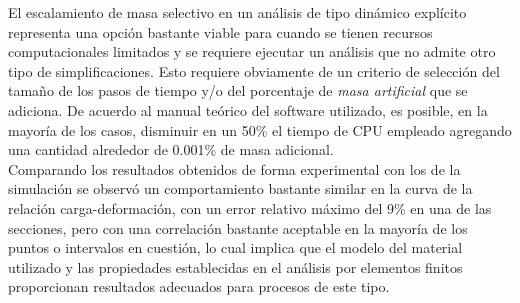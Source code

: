 El escalamiento de masa selectivo en un análisis de tipo dinámico explícito representa una 
opción bastante viable para cuando se tienen recursos computacionales limitados y se 
requiere ejecutar un análisis que no admite otro tipo de simplificaciones. Esto requiere 
obviamente de un criterio de selección del tamaño de los pasos de tiempo y/o del porcentaje 
de \textit{masa artificial} que se adiciona. De acuerdo al manual teórico del software 
utilizado, es posible, en la mayoría de los casos, disminuir en un 50\% el tiempo de CPU 
empleado agregando una cantidad alrededor de 0.001\% de masa adicional.\\

Comparando los resultados obtenidos de forma experimental con los de la simulación se observó un 
comportamiento bastante similar en la curva de la relación carga-deformación, con un error 
relativo máximo del 9\% en una de las secciones, pero con una correlación bastante aceptable en 
la mayoría de los puntos o intervalos en cuestión, lo cual implica que el modelo del material 
utilizado y las propiedades establecidas en el análisis por elementos 
finitos proporcionan resultados adecuados para procesos de este tipo.